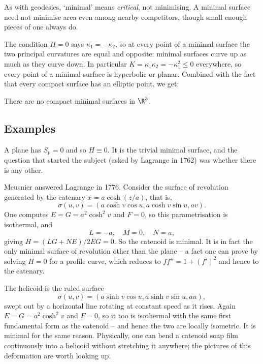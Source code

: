 \begin{remark}
    As with geodesics, `minimal' means \emph{critical}, not minimising. A minimal surface need not minimise area even among nearby competitors, though small enough pieces of one always do.
\end{remark}

The condition $H = 0$ says $\kappa_1 = -\kappa_2$, so at every point of a minimal surface the two principal curvatures are equal and opposite: minimal surfaces curve up as much as they curve down. In particular $K = \kappa_1\kappa_2 = -\kappa_1^2 \leq 0$ everywhere, so every point of a minimal surface is hyperbolic or planar. Combined with the fact that every compact surface has an elliptic point, we get:

\begin{corollary}
    There are no compact minimal surfaces in $\R^3$.
\end{corollary}

\subsection{Examples}

\begin{example}
    A plane has $S_p = 0$ and so $H \equiv 0$. It is the trivial minimal surface, and the question that started the subject (asked by Lagrange in 1762) was whether there is any other.
\end{example}

\begin{example}
    Meusnier answered Lagrange in 1776. Consider the surface of revolution generated by the catenary $x = a\cosh(z/a)$, that is,
    $$
    \sigma(u,v) = \left(a\cosh v \cos u, a\cosh v\sin u, av\right).
    $$
    One computes $E = G = a^2\cosh^2 v$ and $F = 0$, so this parametrisation is isothermal, and
    $$
    L = -a, \quad M = 0, \quad N = a,
    $$
    giving $H = (LG + NE)/2EG = 0$. So the catenoid is minimal. It is in fact the only minimal surface of revolution other than the plane -- a fact one can prove by solving $H = 0$ for a profile curve, which reduces to $f f'' = 1 + (f')^2$ and hence to the catenary.
\end{example}

\begin{example}
    The helicoid is the ruled surface
    $$
    \sigma(u,v) = \left(a\sinh v\cos u, a \sinh v\sin u, au\right),
    $$
    swept out by a horizontal line rotating at constant speed as it rises. Again $E = G = a^2\cosh^2 v$ and $F = 0$, so it too is isothermal with the same first fundamental form as the catenoid -- and hence the two are locally isometric. It is minimal for the same reason. Physically, one can bend a catenoid soap film continuously into a helicoid without stretching it anywhere; the pictures of this deformation are worth looking up.
\end{example}

